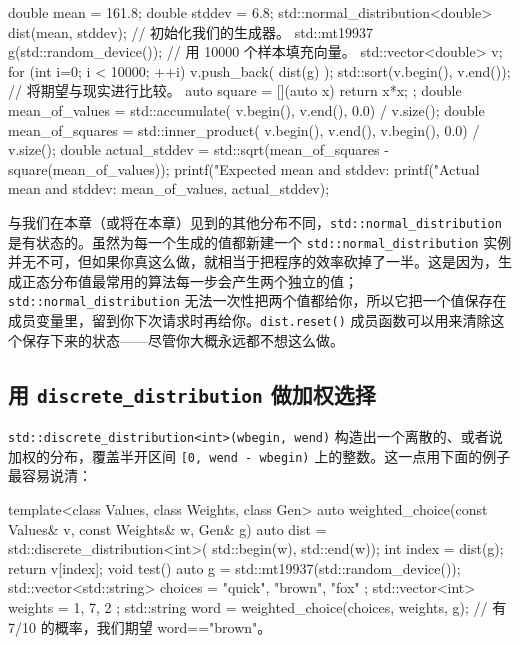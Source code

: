 \begin{codebox}[cpp]
    double mean = 161.8;
    double stddev = 6.8;
    std::normal_distribution<double> dist(mean, stddev);
      // 初始化我们的生成器。
    std::mt19937 g(std::random_device{}());
      // 用 10000 个样本填充向量。
    std::vector<double> v;
    for (int i=0; i < 10000; ++i) {
      v.push_back( dist(g) );
    }
    std::sort(v.begin(), v.end());
      // 将期望与现实进行比较。
    auto square = [](auto x) { return x*x; };
    double mean_of_values = std::accumulate(
      v.begin(), v.end(), 0.0) / v.size();
    double mean_of_squares = std::inner_product(
      v.begin(), v.end(), v.begin(), 0.0) / v.size();
    double actual_stddev =
      std::sqrt(mean_of_squares - square(mean_of_values));
    printf("Expected mean and stddev: %
    printf("Actual mean and stddev: %
           mean_of_values, actual_stddev);
\end{codebox}

与我们在本章（或将在本章）见到的其他分布不同，\texttt{std::\allowbreak{}normal\_\allowbreak{}distribution} 是有状态的。虽然为每一个生成的值都新建一个 \texttt{std::\allowbreak{}normal\_\allowbreak{}distribution} 实例并无不可，但如果你真这么做，就相当于把程序的效率砍掉了一半。这是因为，生成正态分布值最常用的算法每一步会产生两个独立的值；\texttt{std::\allowbreak{}normal\_\allowbreak{}distribution} 无法一次性把两个值都给你，所以它把一个值保存在成员变量里，留到你下次请求时再给你。\texttt{dist.\allowbreak{}reset(\allowbreak{})\allowbreak{}} 成员函数可以用来清除这个保存下来的状态——尽管你大概永远都不想这么做。

\subsection{用 \texttt{discrete\_\allowbreak{}distribution} 做加权选择}

\texttt{std::\allowbreak{}discrete\_\allowbreak{}distribution<\allowbreak{}int>\allowbreak{}(\allowbreak{}wbegin,\allowbreak{} wend)\allowbreak{}} 构造出一个离散的、或者说加权的分布，覆盖半开区间 \texttt{[0,\allowbreak{} wend - wbegin)\allowbreak{}} 上的整数。这一点用下面的例子最容易说清：

\begin{codebox}[cpp]
    template<class Values, class Weights, class Gen>
    auto weighted_choice(const Values& v, const Weights& w, Gen& g)
    {
      auto dist = std::discrete_distribution<int>(
        std::begin(w), std::end(w));
      int index = dist(g);
      return v[index];
    }
    void test() {
      auto g = std::mt19937(std::random_device{}());
      std::vector<std::string> choices =
        { "quick", "brown", "fox" };
      std::vector<int> weights = { 1, 7, 2 };
      std::string word = weighted_choice(choices, weights, g);
        // 有 7/10 的概率，我们期望 word=="brown"。
    }
\end{codebox}


